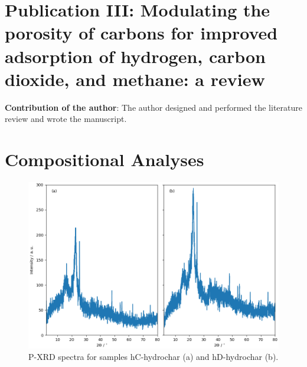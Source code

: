 \begin{appendices}

\newpage
\setcounter{opagenum}{\thepage}
\chapter[Publication III]{Publication III: Modulating the porosity of carbons for improved adsorption of hydrogen, carbon dioxide, and methane: a review}\label{ap:review}

\textbf{Contribution of the author}: The author designed and performed the literature review and wrote the manuscript.

\clearpage
\newpage

\setlength{\originalVOffset}{\voffset}   
\setlength{\originalHOffset}{\hoffset}

\setlength{\voffset}{0cm}
\setlength{\hoffset}{0cm}

\setlength{\voffset}{\originalVOffset}
\setlength{\hoffset}{\originalHOffset}

\clearpage

\chapter{Compositional Analyses}
\newpage
\begin{figure}[h]
    \centering
    \includegraphics[width=\columnwidth, keepaspectratio]{4-cbs/figs/xrd_hydrochar.png}
    \caption{P-XRD spectra for samples hC-hydrochar (a) and hD-hydrochar (b).}
    \label{fig:xrd_hydrochar}
\end{figure}


\end{appendices}

